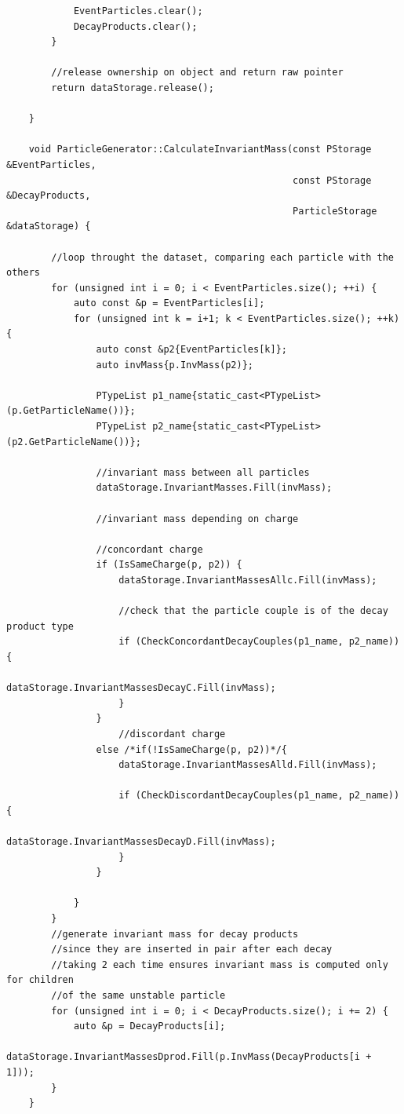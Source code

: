 \documentclass[12pt, a4paper]{article}
\begin{document}
\begin{verbatim}
            EventParticles.clear();
            DecayProducts.clear();
        }

        //release ownership on object and return raw pointer
        return dataStorage.release();

    }

    void ParticleGenerator::CalculateInvariantMass(const PStorage &EventParticles,
                                                   const PStorage &DecayProducts,
                                                   ParticleStorage &dataStorage) {

        //loop throught the dataset, comparing each particle with the others
        for (unsigned int i = 0; i < EventParticles.size(); ++i) {
            auto const &p = EventParticles[i];
            for (unsigned int k = i+1; k < EventParticles.size(); ++k) {
                auto const &p2{EventParticles[k]};
                auto invMass{p.InvMass(p2)};

                PTypeList p1_name{static_cast<PTypeList>(p.GetParticleName())};
                PTypeList p2_name{static_cast<PTypeList>(p2.GetParticleName())};

                //invariant mass between all particles
                dataStorage.InvariantMasses.Fill(invMass);

                //invariant mass depending on charge

                //concordant charge
                if (IsSameCharge(p, p2)) {
                    dataStorage.InvariantMassesAllc.Fill(invMass);

                    //check that the particle couple is of the decay product type
                    if (CheckConcordantDecayCouples(p1_name, p2_name)) {
                        dataStorage.InvariantMassesDecayC.Fill(invMass);
                    }
                }
                    //discordant charge
                else /*if(!IsSameCharge(p, p2))*/{
                    dataStorage.InvariantMassesAlld.Fill(invMass);

                    if (CheckDiscordantDecayCouples(p1_name, p2_name)) {
                        dataStorage.InvariantMassesDecayD.Fill(invMass);
                    }
                }

            }
        }
        //generate invariant mass for decay products
        //since they are inserted in pair after each decay
        //taking 2 each time ensures invariant mass is computed only for children
        //of the same unstable particle
        for (unsigned int i = 0; i < DecayProducts.size(); i += 2) {
            auto &p = DecayProducts[i];
            dataStorage.InvariantMassesDprod.Fill(p.InvMass(DecayProducts[i + 1]));
        }
    }


\end{verbatim}
\end{document}
